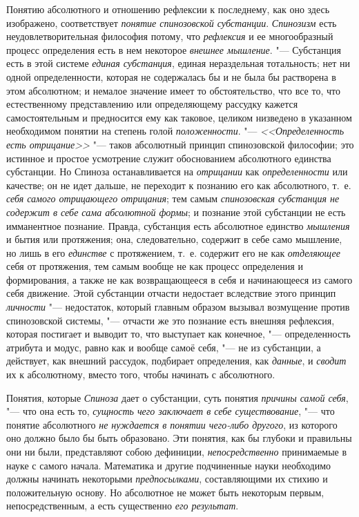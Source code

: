 Понятию абсолютного и отношению рефлексии к последнему, как оно здесь
изображено, соответствует {\em понятие спинозовской
субстанции}. {\em Спинозизм} есть неудовлетворительная
философия потому, что {\em рефлексия} и ее
многообразный процесс определения есть в нем некоторое
{\em внешнее мышление}. "--- Субстанция есть в этой
системе {\em единая субстанция}, единая нераздельная
тотальность; нет ни одной определенности, которая не содержалась бы и не
была бы растворена в этом абсолютном; и немалое значение имеет то
обстоятельство, что все то, что естественному представлению или
определяющему рассудку кажется самостоятельным и предносится ему как
таковое, целиком низведено в указанном необходимом понятии на степень голой
{\em положенности}. "---
{\em <<Определенность есть отрицание>>} "--- таков
абсолютный принцип спинозовской
философии;
это истинное и простое усмотрение служит обоснованием абсолютного единства
субстанции. Но Спиноза останавливается на
{\em отрицании} как
{\em определенности} или качестве; он не идет дальше,
не переходит к познанию его как абсолютного, т.~е.
{\em себя самого отрицающего отрицания}; тем самым
{\em спинозовская субстанция не содержит в себе сама
абсолютной формы}; и познание этой субстанции не есть имманентное познание.
Правда, субстанция есть абсолютное единство
{\em мышления} и бытия или протяжения; она,
следовательно, содержит в себе само мышление, но лишь в его
{\em единстве} с протяжением, т.~е. содержит его не как
{\em отделяющее} себя от протяжения, тем самым вообще
не как процесс определения и формирования, а также не как возвращающееся в
себя и начинающееся из самого себя движение. Этой субстанции отчасти
недостает вследствие этого принцип {\em личности}
"--- недостаток, который главным образом вызывал возмущение против
спинозовской системы, "--- отчасти же это познание есть внешняя рефлексия,
которая постигает и выводит то, что выступает как конечное, "---
определенность атрибута и модус, равно как и вообще самоё себя, "--- не из
субстанции, а действует, как внешний рассудок, подбирает определения, как
{\em данные}, и {\em сводит} их к
абсолютному, вместо того, чтобы начинать с абсолютного.

Понятия, которые {\em Спиноза} дает о субстанции, суть
понятия {\em причины самой себя}, "--- что она есть то,
{\em сущность чего заключает в себе существование}, "---
что понятие абсолютного {\em не нуждается в понятии
чего-либо другого}, из которого оно должно было бы быть образовано. Эти
понятия, как бы глубоки и правильны они ни были, представляют собою
дефиниции, {\em непосредственно} принимаемые в науке с
самого начала. Математика и другие подчиненные науки необходимо должны
начинать некоторыми {\em предпосылками}, составляющими
их стихию и положительную основу. Но абсолютное не может быть некоторым
первым, непосредственным, а есть существенно {\em его
результат}.

